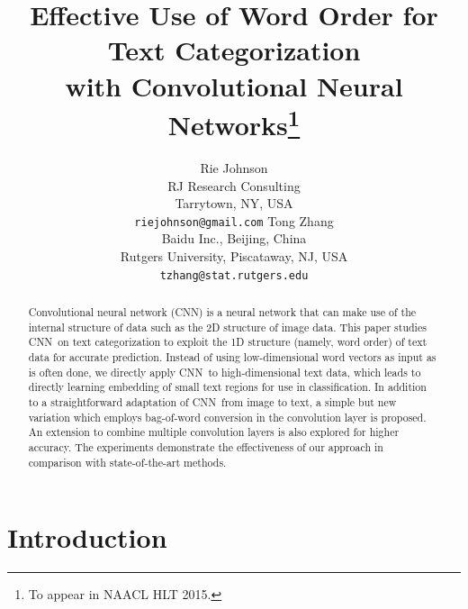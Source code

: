 \documentclass[11pt,letterpaper]{article}
\title{Effective Use of Word Order for Text Categorization \\ with Convolutional Neural Networks\thanks{
To appear in NAACL HLT 2015. 
}}
\author{Rie Johnson\\
	    RJ Research Consulting\\
	    Tarrytown, NY, USA\\
	    {\tt riejohnson@gmail.com}
	  \And
	Tong Zhang\\
    Baidu Inc., Beijing, China \\    
    Rutgers University, Piscataway, NJ, USA \\
  {\tt tzhang@stat.rutgers.edu}
}
\date{}
\newcommand{\cnn}{CNN}
\newcommand{\scnn}{seq-CNN}
\newcommand{\bcnn}{bow-CNN}
\newcommand{\bongram}{bag-of-$n$-gram}
\begin{document}
\maketitle
\begin{abstract}
Convolutional neural network (\cnn) is a neural network that can make use of 
the internal structure of data such as the 2D structure of image data.  
This paper studies \cnn\ on text categorization to exploit
the 1D structure (namely, word order) of text data for accurate prediction.  
Instead of using low-dimensional word vectors as input as is often done, 
we directly apply \cnn\ to high-dimensional text data, which leads to 
directly learning embedding of small text regions for use in classification.  
In addition to a straightforward adaptation of \cnn\ from image to text, 
a simple but new variation which employs bag-of-word conversion in the 
convolution layer is proposed.  
An extension to combine multiple convolution layers is also explored for higher 
accuracy.    
The experiments demonstrate the effectiveness of our approach in comparison with 
state-of-the-art methods.

\end{abstract}

\section{Introduction}
\end{document}
